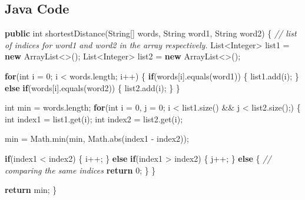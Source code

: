 \documentclass[]{book}
\newenvironment{Shaded}{\begin{snugshade}}{\end{snugshade}}
\newcommand{\BuiltInTok}[1]{#1}
\newcommand{\CommentTok}[1]{\textcolor[rgb]{0.56,0.35,0.01}{\textit{#1}}}
\newcommand{\DataTypeTok}[1]{\textcolor[rgb]{0.13,0.29,0.53}{#1}}
\newcommand{\DecValTok}[1]{\textcolor[rgb]{0.00,0.00,0.81}{#1}}
\newcommand{\FunctionTok}[1]{\textcolor[rgb]{0.00,0.00,0.00}{#1}}
\newcommand{\KeywordTok}[1]{\textcolor[rgb]{0.13,0.29,0.53}{\textbf{#1}}}
\newcommand{\NormalTok}[1]{#1}
\begin{document}
\hypertarget{java-code-34}{%
\subsection{Java Code}\label{java-code-34}}

\begin{Shaded}
\begin{Highlighting}[]
\KeywordTok{public} \DataTypeTok{int} \FunctionTok{shortestDistance}\NormalTok{(}\BuiltInTok{String}\NormalTok{[] words, }\BuiltInTok{String}\NormalTok{ word1, }\BuiltInTok{String}\NormalTok{ word2) \{}
    \CommentTok{// list of indices for word1 and word2 in the array respectively.}
    \BuiltInTok{List}\NormalTok{<}\BuiltInTok{Integer}\NormalTok{> list1 = }\KeywordTok{new} \BuiltInTok{ArrayList}\NormalTok{<>();}
    \BuiltInTok{List}\NormalTok{<}\BuiltInTok{Integer}\NormalTok{> list2 = }\KeywordTok{new} \BuiltInTok{ArrayList}\NormalTok{<>();}

    \KeywordTok{for}\NormalTok{(}\DataTypeTok{int}\NormalTok{ i = }\DecValTok{0}\NormalTok{; i < words.}\FunctionTok{length}\NormalTok{; i++) \{}
        \KeywordTok{if}\NormalTok{(words[i].}\FunctionTok{equals}\NormalTok{(word1)) \{}
\NormalTok{            list1.}\FunctionTok{add}\NormalTok{(i);}
\NormalTok{        \} }\KeywordTok{else} \KeywordTok{if}\NormalTok{(words[i].}\FunctionTok{equals}\NormalTok{(word2)) \{}
\NormalTok{            list2.}\FunctionTok{add}\NormalTok{(i);}
\NormalTok{        \}}
\NormalTok{    \}}

    \DataTypeTok{int}\NormalTok{ min = words.}\FunctionTok{length}\NormalTok{;}
    \KeywordTok{for}\NormalTok{(}\DataTypeTok{int}\NormalTok{ i = }\DecValTok{0}\NormalTok{, j = }\DecValTok{0}\NormalTok{; i < list1.}\FunctionTok{size}\NormalTok{() && j < list2.}\FunctionTok{size}\NormalTok{();) \{}
        \DataTypeTok{int}\NormalTok{ index1 = list1.}\FunctionTok{get}\NormalTok{(i);}
        \DataTypeTok{int}\NormalTok{ index2 = list2.}\FunctionTok{get}\NormalTok{(i);}

\NormalTok{        min = }\BuiltInTok{Math}\NormalTok{.}\FunctionTok{min}\NormalTok{(min, }\BuiltInTok{Math}\NormalTok{.}\FunctionTok{abs}\NormalTok{(index1 - index2));}

        \KeywordTok{if}\NormalTok{(index1 < index2) \{}
\NormalTok{            i++;}
\NormalTok{        \} }\KeywordTok{else} \KeywordTok{if}\NormalTok{(index1 > index2) \{}
\NormalTok{            j++;}
\NormalTok{        \} }\KeywordTok{else}\NormalTok{ \{}
            \CommentTok{// comparing the same indices}
            \KeywordTok{return} \DecValTok{0}\NormalTok{;}
\NormalTok{        \}}
\NormalTok{    \}}

    \KeywordTok{return}\NormalTok{ min;}
\NormalTok{\}}
\end{Highlighting}
\end{Shaded}
\end{document}
